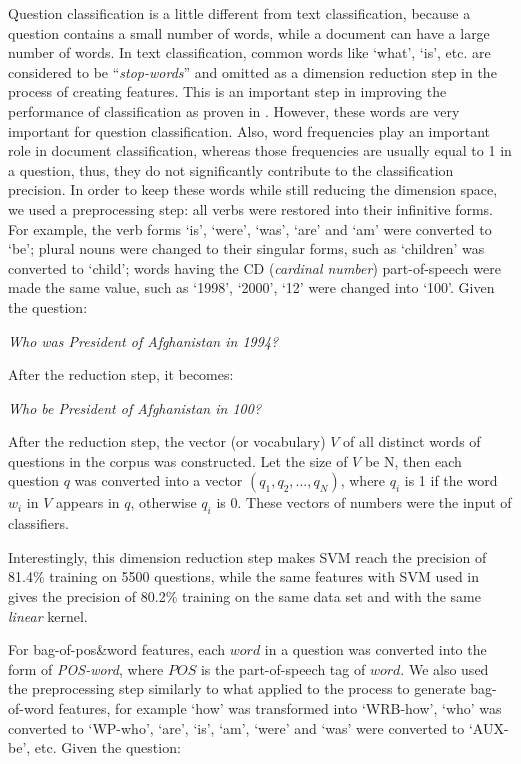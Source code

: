 \documentclass[english]{jnlp_1.4}
\begin{document}
Question classification is a little different from text
classification, because a question contains a small number of
words, while a document can have a large number of words. In text
classification, common words like `what', `is', etc. are
considered to be ``\emph{stop-words}'' and omitted as a dimension
reduction step in the process of creating features. This is an
important step in improving the performance of classification as
proven in \cite{Thorsten1998}. However, these words are very
important for question classification. Also, word frequencies play
an important role in document classification, whereas those
frequencies are usually equal to 1 in a question, thus, they do
not significantly contribute to the classification precision. In
order to keep these words while still reducing the dimension
space, we used a preprocessing step: all verbs were restored into
their infinitive forms. For example, the verb forms `is', `were',
`was', `are' and `am' were converted to `be'; plural nouns were
changed to their singular forms, such as `children' was converted
to `child'; words having the CD (\emph{cardinal number})
part-of-speech were made the same value, such as `1998', `2000',
`12' were changed into `100'. Given the question:

\textit{Who was President of Afghanistan in 1994?}

After the reduction step, it becomes:

  \textit{Who be President of Afghanistan in 100?}

After the reduction step, the vector (or vocabulary) $V$ of all
distinct words of questions in the corpus was constructed. Let the
size of $V$ be N, then each question $q$ was converted into a
vector $(q_{1}, q_{2},\ldots,q_{N})$, where $q_{i}$ is 1 if the
word $w_{i}$ in $V$ appears in $q$, otherwise $q_{i}$ is 0. These
vectors of numbers were the input of classifiers.

Interestingly, this dimension reduction step makes SVM reach the
precision of 81.4\% training on 5500 questions, while the same
features with SVM used in \cite{Dell03} gives the precision of
80.2\% training on the same data set and with the same
\emph{linear} kernel.

For bag-of-pos\&word features, each $word$ in a question was
converted into the form of \emph{POS-word}, where $POS$ is the
part-of-speech tag of $word$. We also used the preprocessing step
similarly to what applied to the process to generate bag-of-word
features, for example `how' was transformed into `WRB-how', `who'
was converted to `WP-who', `are', `is', `am', `were' and `was'
were converted to `AUX-be', etc. Given the question:
\end{document}
